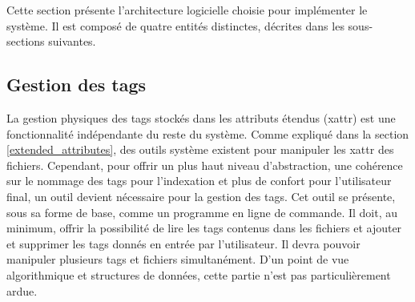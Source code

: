 Cette section présente l'architecture logicielle choisie pour implémenter le système. 
Il est composé de quatre entités distinctes, décrites dans les sous-sections suivantes.

\subsection{Gestion des tags}
La gestion physiques des tags stockés dans les attributs étendus (\acrshort{xattr}) est une fonctionnalité indépendante du 
reste du système. Comme expliqué dans la section \ref{extended_attributes}, des outils système existent pour 
manipuler les \acrshort{xattr} des fichiers. Cependant, pour offrir un plus haut niveau d'abstraction, 
une cohérence sur le nommage des tags pour l'indexation et plus de confort pour l'utilisateur final, 
un outil devient nécessaire pour la gestion des tags. Cet outil se présente, sous sa forme de base, 
comme un programme en ligne de commande. Il doit, au minimum, offrir la possibilité de lire les tags 
contenus dans les fichiers et ajouter et supprimer les tags donnés en entrée par l'utilisateur. 
Il devra pouvoir manipuler plusieurs tags et fichiers simultanément. D'un point de vue algorithmique 
et structures de données, cette partie n'est pas particulièrement ardue.

